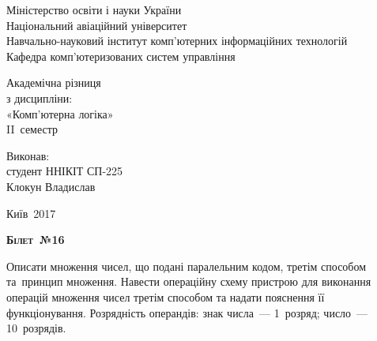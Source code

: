 \documentclass[a4paper,oneside,DIV=12,12pt]{scrartcl}
\newcommand{\sheetno}[1]{{\centering\scshape\bfseries Білет~№{#1}\par}}
\begin{document}
	\begin{titlepage}
		\begin{center}
			Міністерство освіти і науки України\\
			Національний авіаційний університет\\
			Навчально-науковий інститут комп'ютерних інформаційних технологій\\
			Кафедра комп'ютеризованих систем управління
			
			\vspace{\fill}
				Академічна різниця\\
				з дисципліни:\\
				«Комп'ютерна логіка»\\
				II~семестр
				
			\vspace{\fill}
			
			\begin{flushright}
				Виконав:\\
				студент ННІКІТ СП-225\\
				Клокун Владислав\\
			\end{flushright}
			Київ~2017
		\end{center}
	\end{titlepage}
	
	\sheetno{16}
	
	\begin{exercise}
		Описати множення чисел, що подані паралельним кодом, третім способом та~принцип множення. Навести операційну схему пристрою для виконання операцій множення чисел третім способом та надати пояснення її функціонування. Розрядність операндів: знак числа~— 1~розряд; число~— 10~розрядів.
	\end{exercise}
	
\end{document}
